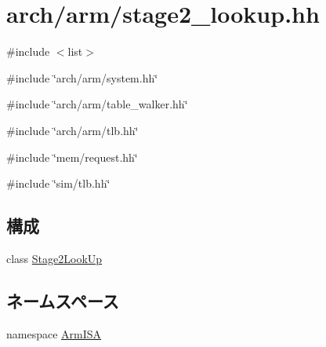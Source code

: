 \hypertarget{stage2__lookup_8hh}{
\section{arch/arm/stage2\_\-lookup.hh}
\label{stage2__lookup_8hh}
}
{\ttfamily \#include $<$list$>$}\par
{\ttfamily \#include \char`\"{}arch/arm/system.hh\char`\"{}}\par
{\ttfamily \#include \char`\"{}arch/arm/table\_\-walker.hh\char`\"{}}\par
{\ttfamily \#include \char`\"{}arch/arm/tlb.hh\char`\"{}}\par
{\ttfamily \#include \char`\"{}mem/request.hh\char`\"{}}\par
{\ttfamily \#include \char`\"{}sim/tlb.hh\char`\"{}}\par
\subsection*{構成}
\begin{DoxyCompactItemize}
\item 
class \hyperlink{classArmISA_1_1Stage2LookUp}{Stage2LookUp}
\end{DoxyCompactItemize}
\subsection*{ネームスペース}
\begin{DoxyCompactItemize}
\item 
namespace \hyperlink{namespaceArmISA}{ArmISA}
\end{DoxyCompactItemize}
